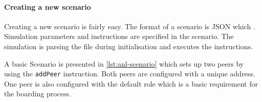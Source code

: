 \paragraph{Creating a new scenario}
Creating a new scenario is fairly easy. The format of a scenario is JSON which \cite{wiki:json}.
Simulation parameters and instructions are specified in the scenario. The simulation is parsing the file during initialisation and executes the instructions.

A basic Scenario is presented in \vref{lst:anl-scenario} which sets up two peers by using the \lstinline|addPeer| instruction. Both peers are configured with a unique address. One peer is also configured with the  default role \signal which is a basic requirement for the boarding process. 

